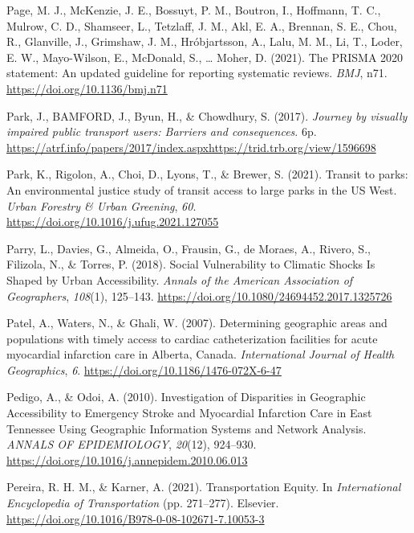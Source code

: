 \documentclass[
  letterpaper,
  DIV=11,
  numbers=noendperiod]{scrartcl}
\newlength{\cslhangindent}
\newenvironment{CSLReferences}[2] %
 {\begin{list}{}{%
  \setlength{\itemindent}{0pt}
  \setlength{\leftmargin}{0pt}
  \setlength{\parsep}{0pt}
  \ifodd #1
   \setlength{\leftmargin}{\cslhangindent}
   \setlength{\itemindent}{-1\cslhangindent}
  \fi
  \setlength{\itemsep}{#2\baselineskip}}}
 {\end{list}}
\begin{document}
\begin{CSLReferences}{1}{0}
Page, M. J., McKenzie, J. E., Bossuyt, P. M., Boutron, I., Hoffmann, T.
C., Mulrow, C. D., Shamseer, L., Tetzlaff, J. M., Akl, E. A., Brennan,
S. E., Chou, R., Glanville, J., Grimshaw, J. M., Hróbjartsson, A., Lalu,
M. M., Li, T., Loder, E. W., Mayo-Wilson, E., McDonald, S., \ldots{}
Moher, D. (2021). The {PRISMA} 2020 statement: An updated guideline for
reporting systematic reviews. \emph{BMJ}, n71.
\url{https://doi.org/10.1136/bmj.n71}

Park, J., BAMFORD, J., Byun, H., \& Chowdhury, S. (2017). \emph{Journey
by visually impaired public transport users: {Barriers} and
consequences}. 6p.
\url{https://atrf.info/papers/2017/index.aspxhttps://trid.trb.org/view/1596698}

Park, K., Rigolon, A., Choi, D., Lyons, T., \& Brewer, S. (2021).
Transit to parks: {An} environmental justice study of transit access to
large parks in the {US West}. \emph{Urban Forestry \& Urban Greening},
\emph{60}. \url{https://doi.org/10.1016/j.ufug.2021.127055}

Parry, L., Davies, G., Almeida, O., Frausin, G., de Moraes, A., Rivero,
S., Filizola, N., \& Torres, P. (2018). Social {Vulnerability} to
{Climatic Shocks Is Shaped} by {Urban Accessibility}. \emph{Annals of
the American Association of Geographers}, \emph{108}(1), 125--143.
\url{https://doi.org/10.1080/24694452.2017.1325726}

Patel, A., Waters, N., \& Ghali, W. (2007). Determining geographic areas
and populations with timely access to cardiac catheterization facilities
for acute myocardial infarction care in {Alberta}, {Canada}.
\emph{International Journal of Health Geographics}, \emph{6}.
\url{https://doi.org/10.1186/1476-072X-6-47}

Pedigo, A., \& Odoi, A. (2010). Investigation of {Disparities} in
{Geographic Accessibility} to {Emergency Stroke} and {Myocardial
Infarction Care} in {East Tennessee Using Geographic Information
Systems} and {Network Analysis}. \emph{ANNALS OF EPIDEMIOLOGY},
\emph{20}(12), 924--930.
\url{https://doi.org/10.1016/j.annepidem.2010.06.013}

Pereira, R. H. M., \& Karner, A. (2021). Transportation {Equity}. In
\emph{International {Encyclopedia} of {Transportation}} (pp. 271--277).
{Elsevier}. \url{https://doi.org/10.1016/B978-0-08-102671-7.10053-3}


\end{CSLReferences}
\end{document}
